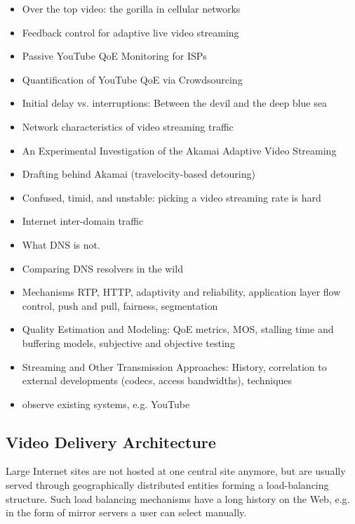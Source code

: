 \begin{itemize}
	\item Over the top video: the gorilla in cellular networks \cite{Erman:2011:OTV:2068816.2068829}
	\item Feedback control for adaptive live video streaming \cite{DeCicco:2011:FCA:1943552.1943573}
	\item Passive YouTube QoE Monitoring for ISPs \cite{6296879}
	\item Quantification of YouTube QoE via Crowdsourcing \cite{6123395}
	\item Initial delay vs. interruptions: Between the devil and the deep blue sea \cite{6263849}
	\item Network characteristics of video streaming traffic \cite{Rao:2011:NCV:2079296.2079321}
	\item An Experimental Investigation of the Akamai Adaptive Video Streaming \cite{cicco2010akamai}
	\item Drafting behind Akamai (travelocity-based detouring) \cite{Su:2006:DBA:1159913.1159962}
	\item Confused, timid, and unstable: picking a video streaming rate is hard \cite{Huang:2012:CTU:2398776.2398800}
	\item Internet inter-domain traffic \cite{Labovitz:2010:IIT:2043164.1851194}
	\item What DNS is not. \cite{vixie2009dns}
	\item Comparing DNS resolvers in the wild \cite{ager2010comparing}


	\item Mechanisms RTP, HTTP, adaptivity and reliability, application layer flow control, push and pull, fairness, segmentation
	\item Quality Estimation and Modeling: QoE metrics, MOS, stalling time and buffering models, subjective and objective testing

	\item Streaming and Other Transmission Approaches: History, correlation to external developments (codecs, access bandwidths), techniques

	\item observe existing systems, e.g. YouTube \cite{metzger2011delivery}
\end{itemize}

\subsection{Video Delivery Architecture}
\label{c3:sec:videodeliveryarchitecture}
Large Internet sites are not hosted at one central site anymore, but are usually served through geographically distributed entities forming a load-balancing structure. Such load balancing mechanisms have a long history on the Web, e.g. in the form of mirror servers a user can select manually.

